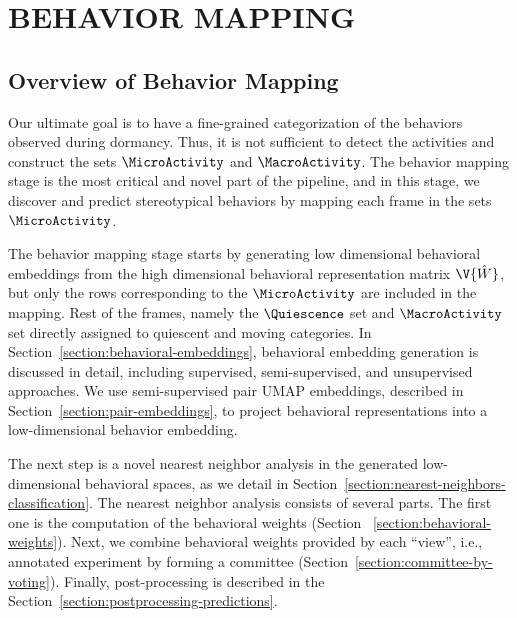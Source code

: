 \setlength{\parindent}{0pt}
\chapter{\bf BEHAVIOR MAPPING}\label{chapter:behavior-mapping}
\section{Overview of Behavior Mapping}
Our ultimate goal is to have a fine-grained categorization of the behaviors observed during dormancy. Thus, it is not sufficient to detect the activities and construct the sets $\MicroActivity$ and $\MacroActivity$. The behavior mapping stage is the most critical and novel part of the pipeline, and in this stage, we discover and predict stereotypical behaviors by mapping each frame in the sets $\MicroActivity$.

The behavior mapping stage starts by generating low dimensional behavioral embeddings from the high dimensional behavioral representation matrix $\V{\hat{W}}$, but only the rows corresponding to the $\MicroActivity$ are included in the mapping.
Rest of the frames, namely the $\Quiescence$ set and $\MacroActivity$ set directly assigned to quiescent and moving categories.
In Section~\ref{section:behavioral-embeddings}, behavioral embedding generation is discussed in detail, including supervised, semi-supervised, and unsupervised approaches.
We use semi-supervised pair UMAP embeddings, described in Section~\ref{section:pair-embeddings}, to project behavioral representations into a low-dimensional behavior embedding.

The next step is a novel nearest neighbor analysis in the generated low-dimensional behavioral spaces, as we detail in Section~\ref{section:nearest-neighbors-classification}.
The nearest neighbor analysis consists of several parts.
The first one is the computation of the behavioral weights (Section ~\ref{section:behavioral-weights}).
Next, we combine behavioral weights provided by each ``view'', i.e., annotated experiment by forming a committee (Section~\ref{section:committee-by-voting}).
Finally, post-processing is described in the Section~\ref{section:postprocessing-predictions}.

